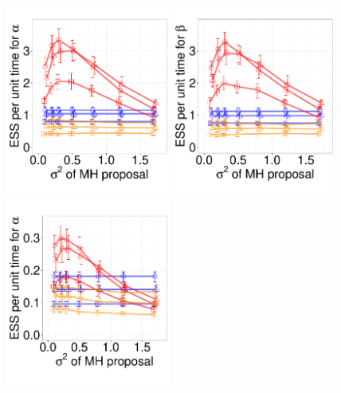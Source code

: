 {%

  \begin{figure}%
  \centering
  \begin{minipage}[!hp]{0.6\linewidth}
  \centering
    \includegraphics [width=0.48\textwidth, angle=0]{figs/pc_3_alpha.pdf}
    \includegraphics [width=0.48\textwidth, angle=0]{figs/pc_3_beta.pdf}
  \centering
    \includegraphics [width=0.480\textwidth, angle=0]{figs/pc_10_alpha.pdf}

\end{minipage}
\end{figure}}
